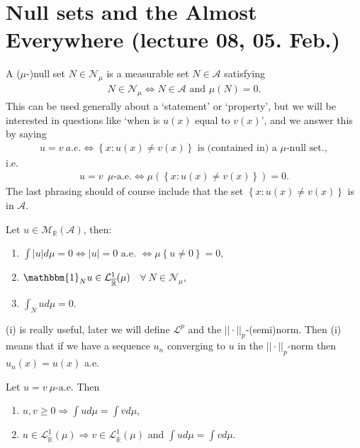 \section{Null sets and the Almost Everywhere (lecture 08, 05. Feb.)}
\begin{definition}
    A (\(\mu\)-)null set \(N\in\mathcal{N}_{\mu}\) is a measurable set \(N\in\mathscr{A}\) satisfying
    \begin{align}
        N\in\mathcal{N}_{\mu} \Longleftrightarrow N\in\mathscr{A} \text{ and } \mu(N) = 0.
    \end{align}
    This can be used generally about a `statement' or `property', but we will be interested in questions like 
    `when is \(u(x)\) equal to \(v(x)\)', and we answer this by saying
    \begin{align}
        u=v \ a.e. \Leftrightarrow \left\{ x: u(x) \neq v(x) \right\} \text{ is (contained in) a }\mu\text{-null set.}, 
    \end{align}
    i.e.
    \begin{align}
        u=v \ \  \mu\text{-a.e.} \Leftrightarrow \mu\left( \left\{ x: u(x) \neq v(x) \right\} \right) = 0.
    \end{align}
    The last phrasing should of course include that the set \( \left\{ x: u(x) \neq v(x) \right\}\) is in \(\mathscr{A}\).
\end{definition}
\begin{theorem} \label{th:11.2}
    Let \(u\in \mathcal{M}_{\overline{\mathbb{R}}}(\mathscr{A})\), then:
    \begin{enumerate}[label=(\roman*)]
        \item \(\int\vert u\vert d\mu = 0 \Leftrightarrow \vert u\vert = 0 \text{ a.e. } \Leftrightarrow \mu\left\{u\neq0\right\} = 0\),
        \item \(\mathbbm{1}_{N}u\in \mathcal{L}^{1}_{\overline{\mathbb{R}}}(\mu)\) \ \(\forall \ N\in\mathcal{N}_{\mu}\),
        \item \(\int_Nud\mu = 0\).
    \end{enumerate}
    (i) is really useful, later we will define \(\mathcal{L}^p\) and the \(||\cdot||_p\)-(semi)norm. Then (i) means that if we have a
    sequence \(u_n\) converging to \(u\) in the \(||\cdot ||_p\)-norm then \(u_n(x) = u(x)\) a.e.
\end{theorem}
\begin{corollary}
    Let \(u=v \ \mu \text{-a.e.}\) Then
    \begin{enumerate}[label=(\roman*)]
        \item \(u,v \geq 0 \Rightarrow \int ud\mu = \int vd\mu\),
        \item \(u\in\mathcal{L}^{1}_{\overline{\mathbb{R}}}(\mu) \Rightarrow v\in\mathcal{L}^{1}_{\overline{\mathbb{R}}}(\mu)\) and \(\int ud\mu = \int vd\mu\).
    \end{enumerate}
\end{corollary}
